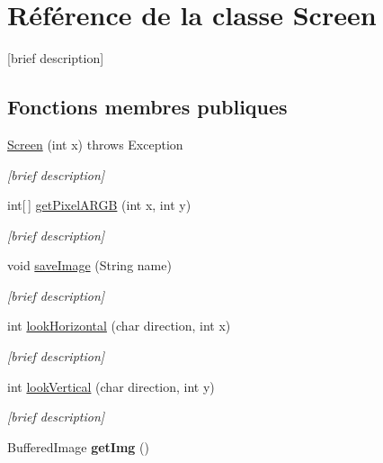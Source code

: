 \hypertarget{classScreen}{\section{Référence de la classe Screen}
\label{classScreen}
}


\mbox{[}brief description\mbox{]}  


\subsection*{Fonctions membres publiques}
\begin{DoxyCompactItemize}
\item 
\hyperlink{classScreen_a944bda9e3f92c3804a758344452cedec}{Screen} (int x)  throws Exception 
\begin{DoxyCompactList}\small\item\em \mbox{[}brief description\mbox{]} \end{DoxyCompactList}\item 
int\mbox{[}$\,$\mbox{]} \hyperlink{classScreen_a53a686061b370313b2b45f413d10d952}{get\+Pixel\+A\+R\+G\+B} (int x, int y)
\begin{DoxyCompactList}\small\item\em \mbox{[}brief description\mbox{]} \end{DoxyCompactList}\item 
void \hyperlink{classScreen_ac86eef31557c08cf24587b22167af892}{save\+Image} (String name)
\begin{DoxyCompactList}\small\item\em \mbox{[}brief description\mbox{]} \end{DoxyCompactList}\item 
int \hyperlink{classScreen_a5330c5c05f38882dc5e7afb3a5750ac3}{look\+Horizontal} (char direction, int x)
\begin{DoxyCompactList}\small\item\em \mbox{[}brief description\mbox{]} \end{DoxyCompactList}\item 
int \hyperlink{classScreen_a988aa468f30d44c000e5e65166a9c252}{look\+Vertical} (char direction, int y)
\begin{DoxyCompactList}\small\item\em \mbox{[}brief description\mbox{]} \end{DoxyCompactList}\item 
\hypertarget{classScreen_a80867c729d8781977b5d353847401e77}{Buffered\+Image {\bfseries get\+Img} ()}\label{classScreen_a80867c729d8781977b5d353847401e77}


\end{DoxyCompactItemize}
